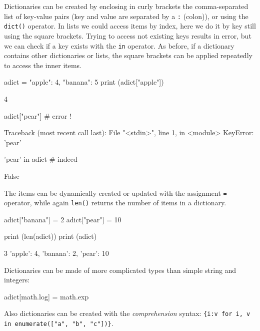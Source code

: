 Dictionaries can be created by enclosing in curly brackets the comma-separated list of key-value pairs (key and value are separated by a \texttt{:} (colon)), or using the \texttt{dict()} operator. In lists we could access items by index, here we do it by key still using the square brackets. Trying to access not existing keys results in error, but we can check if a key exists with the \texttt{in} operator. As before, if a dictionary contains other dictionaries or lists, the square brackets can be applied repeatedly to access the inner items.

\begin{ipython}
adict = {"apple": 4, "banana": 5}
print (adict["apple"])
\end{ipython}
\begin{ioutput}
4
\end{ioutput}

\begin{ipython}
adict["pear"] # error !
\end{ipython}
\begin{ioutput}
Traceback (most recent call last):
  File "<stdin>", line 1, in <module>
KeyError: 'pear'
\end{ioutput}

\begin{ipython}
'pear' in adict # indeed
\end{ipython}
\begin{ioutput}
False
\end{ioutput}

The items can be dynamically created or updated with the assignment \texttt{=} operator, while again \texttt{len()} returns the number of items in a dictionary.

\begin{ipython}
adict["banana"] = 2
adict["pear"] = 10

print (len(adict))
print (adict)
\end{ipython}
\begin{ioutput}
3
{'apple': 4, 'banana': 2, 'pear': 10}
\end{ioutput}

Dictionaries can be made of more complicated types than simple string and integers:

\begin{ipython}
adict[math.log] = math.exp
\end{ipython}

Also dictionaries can be created with the \emph{comprehension} syntax: \texttt{\{i:v for i, v in enumerate(["a", "b", "c"])\}}.

